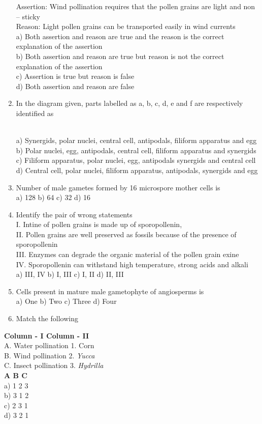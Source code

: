 \begin{enumerate}
  Assertion: Wind pollination requires that the pollen grains are light
  and non -- sticky\\
  Reason: Light pollen grains can be transported easily in wind
  currents\\
  a) Both assertion and reason are true and the reason is the correct
  explanation of the assertion\\
  b) Both assertion and reason are true but reason is not the correct
  explanation of the assertion\\
  c) Assertion is true but reason is false\\
  d) Both assertion and reason are false
\item
  In the diagram given, parts labelled as a, b, c, d, e and f are
  respectively identified as\\
  \strut \\
  a) Synergids, polar nuclei, central cell, antipodals, filiform
  apparatus and egg\\
  b) Polar nuclei, egg, antipodals, central cell, filiform apparatus and
  synergids\\
  c) Filiform apparatus, polar nuclei, egg, antipodals synergids and
  central cell\\
  d) Central cell, polar nuclei, filiform apparatus, antipodals,
  synergids and egg
\item
  Number of male gametes formed by 16 microspore mother cells is\\
  a) 128 b) 64 c) 32 d) 16
\item
  Identify the pair of wrong statements\\
  I. Intine of pollen grains is made up of sporopollenin,\\
  II. Pollen grains are well preserved as fossils because of the
  presence of sporopollenin\\
  III. Enzymes can degrade the organic material of the pollen grain
  exine\\
  IV. Sporopollenin can withstand high temperature, strong acids and
  alkali\\
  a) III, IV b) I, III c) I, II d) II, III
\item
  Cells present in mature male gametophyte of angiosperms is\\
  a) One b) Two c) Three d) Four
\item
  Match the following
\end{enumerate}

\textbf{Column - I Column - II}\\
A. Water pollination 1. Corn\\
B. Wind pollination 2. \emph{Yucca}\\
C. Insect pollination 3. \emph{Hydrilla}\\
\textbf{A B C}\\
a) 1 2 3\\
b) 3 1 2\\
c) 2 3 1\\
d) 3 2 1

